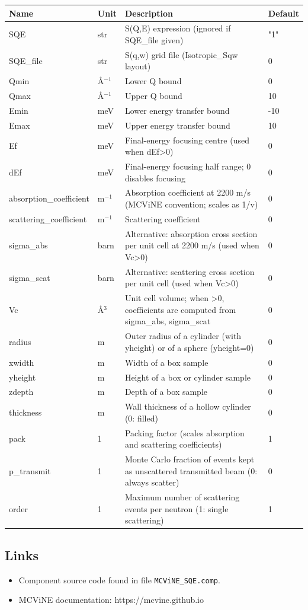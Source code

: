 \begin{longtable}{p{}p{}p{}p{}}
\toprule
\textbf{Name} & \textbf{Unit} & \textbf{Description} & \textbf{Default} \\
\midrule
\endhead
SQE & str & S(Q,E) expression (ignored if SQE\_file given) & "1" \\
SQE\_file & str & S(q,w) grid file (Isotropic\_Sqw layout) & 0 \\
Qmin & \AA{}$^{-1}$ & Lower Q bound & 0 \\
Qmax & \AA{}$^{-1}$ & Upper Q bound & 10 \\
Emin & meV & Lower energy transfer bound & -10 \\
Emax & meV & Upper energy transfer bound & 10 \\
Ef & meV & Final-energy focusing centre (used when dEf\textgreater{}0) & 0 \\
dEf & meV & Final-energy focusing half range; 0 disables focusing & 0 \\
absorption\_coefficient & m$^{-1}$ & Absorption coefficient at 2200 m/s (MCViNE convention; scales as 1/v) & 0 \\
scattering\_coefficient & m$^{-1}$ & Scattering coefficient & 0 \\
sigma\_abs & barn & Alternative: absorption cross section per unit cell at 2200 m/s (used when Vc\textgreater{}0) & 0 \\
sigma\_scat & barn & Alternative: scattering cross section per unit cell (used when Vc\textgreater{}0) & 0 \\
Vc & \AA{}$^{3}$ & Unit cell volume; when \textgreater{}0, coefficients are computed from sigma\_abs, sigma\_scat & 0 \\
radius & m & Outer radius of a cylinder (with yheight) or of a sphere (yheight=0) & 0 \\
xwidth & m & Width of a box sample & 0 \\
yheight & m & Height of a box or cylinder sample & 0 \\
zdepth & m & Depth of a box sample & 0 \\
thickness & m & Wall thickness of a hollow cylinder (0: filled) & 0 \\
pack & 1 & Packing factor (scales absorption and scattering coefficients) & 1 \\
p\_transmit & 1 & Monte Carlo fraction of events kept as unscattered transmitted beam (0: always scatter) & 0 \\
order & 1 & Maximum number of scattering events per neutron (1: single scattering) & 1 \\
\bottomrule
\end{longtable}

\subsection*{Links}
\begin{itemize}
  \item Component source code found in file \texttt{MCViNE\_SQE.comp}.
  \item MCViNE documentation: https://mcvine.github.io
\end{itemize}
